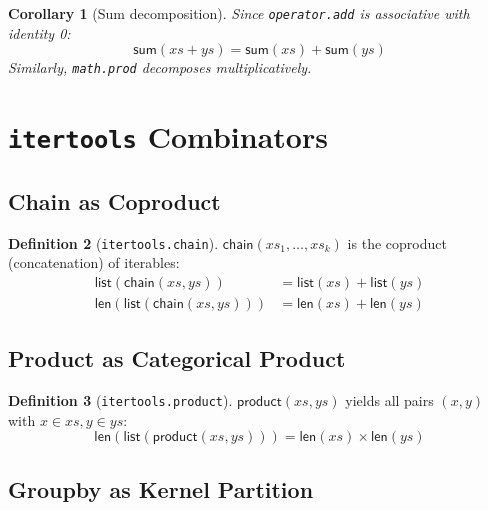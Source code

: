 \documentclass[11pt,a4paper]{report}
\theoremstyle{definition}
\newtheorem{definition}{Definition}[chapter]
\theoremstyle{plain}
\newtheorem{corollary}[definition]{Corollary}
\begin{document}
\begin{corollary}[Sum decomposition]
Since \lstinline[style=python]{operator.add} is associative with identity 0:
\[
  \mathsf{sum}(xs + ys) = \mathsf{sum}(xs) + \mathsf{sum}(ys)
\]
Similarly, \lstinline[style=python]{math.prod} decomposes multiplicatively.
\end{corollary}


\section{\texttt{itertools} Combinators}

\subsection{Chain as Coproduct}

\begin{definition}[\texttt{itertools.chain}]
$\mathsf{chain}(xs_1, \ldots, xs_k)$ is the coproduct (concatenation) of iterables:
\begin{align}
  \mathsf{list}(\mathsf{chain}(xs, ys)) &= \mathsf{list}(xs) + \mathsf{list}(ys) \\
  \mathsf{len}(\mathsf{list}(\mathsf{chain}(xs, ys))) &= \mathsf{len}(xs) + \mathsf{len}(ys)
\end{align}
\end{definition}

\subsection{Product as Categorical Product}

\begin{definition}[\texttt{itertools.product}]
$\mathsf{product}(xs, ys)$ yields all pairs $(x, y)$ with $x \in xs, y \in ys$:
\[
  \mathsf{len}(\mathsf{list}(\mathsf{product}(xs, ys))) = \mathsf{len}(xs) \times \mathsf{len}(ys)
\]
\end{definition}

\subsection{Groupby as Kernel Partition}
\end{document}
